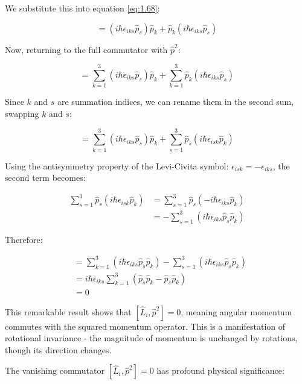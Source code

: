 \documentclass[italian]{HKNdocument}
\begin{document}
We substitute this into equation \eqref{eq:1.68}:

\begin{equation}
[\hat{L}_i, \hat{p}_k^2] = (i\hbar\epsilon_{iks}\hat{p}_s)\hat{p}_k + \hat{p}_k(i\hbar\epsilon_{iks}\hat{p}_s)
\end{equation}

Now, returning to the full commutator with $\hat{p}^2$:

\begin{equation}
[\hat{L}_i, \hat{p}^2] = \sum_{k=1}^{3}(i\hbar\epsilon_{iks}\hat{p}_s)\hat{p}_k + \sum_{k=1}^{3}\hat{p}_k(i\hbar\epsilon_{iks}\hat{p}_s)
\end{equation}

Since $k$ and $s$ are summation indices, we can rename them in the second sum, swapping $k$ and $s$:

\begin{equation}
[\hat{L}_i, \hat{p}^2] = \sum_{k=1}^{3}(i\hbar\epsilon_{iks}\hat{p}_s)\hat{p}_k + \sum_{s=1}^{3}\hat{p}_s(i\hbar\epsilon_{isk}\hat{p}_k)
\end{equation}

Using the antisymmetry property of the Levi-Civita symbol: $\epsilon_{isk} = -\epsilon_{iks}$, the second term becomes:

\begin{align}
\sum_{s=1}^{3}\hat{p}_s(i\hbar\epsilon_{isk}\hat{p}_k) &= \sum_{s=1}^{3}\hat{p}_s(-i\hbar\epsilon_{iks}\hat{p}_k) \\
&= -\sum_{s=1}^{3}(i\hbar\epsilon_{iks}\hat{p}_s\hat{p}_k)
\end{align}

Therefore:

\begin{align}
[\hat{L}_i, \hat{p}^2] &= \sum_{k=1}^{3}(i\hbar\epsilon_{iks}\hat{p}_s\hat{p}_k) - \sum_{s=1}^{3}(i\hbar\epsilon_{iks}\hat{p}_s\hat{p}_k) \\
&= i\hbar\epsilon_{iks}\sum_{k=1}^{3}(\hat{p}_s\hat{p}_k - \hat{p}_s\hat{p}_k) \\
&= 0
\end{align}

This remarkable result shows that $[\hat{L}_i, \hat{p}^2] = 0$, meaning angular momentum commutes with the squared momentum operator. This is a manifestation of rotational invariance - the magnitude of momentum is unchanged by rotations, though its direction changes.

The vanishing commutator $[\hat{L}_i, \hat{p}^2] = 0$ has profound physical significance:
\end{document}
